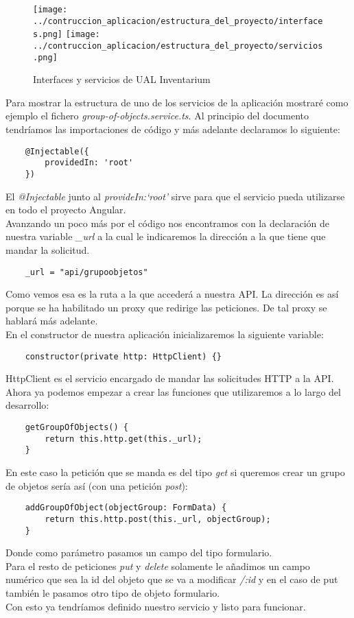 \begin{figure}[h]
    \centering
    \texttt{[image: ../contruccion\_aplicacion/estructura\_del\_proyecto/interfaces.png]}
    \texttt{[image: ../contruccion\_aplicacion/estructura\_del\_proyecto/servicios.png]}
    \caption{Interfaces y servicios de UAL Inventarium}
\end{figure}

Para mostrar la estructura de uno de los servicios de la aplicación mostraré como ejemplo el fichero \textit{group-of-objects.service.ts}. Al principio del documento tendríamos las importaciones de código y más adelante declaramos lo siguiente:
\begin{verbatim}
    @Injectable({
        providedIn: 'root'
    })
\end{verbatim}
El \textit{@Injectable} junto al \textit{provideIn:`root'} sirve para que el servicio pueda utilizarse en todo el proyecto Angular.
\\Avanzando un poco más por el código nos encontramos con la declaración de nuestra variable \textit{\_url} a la cual le indicaremos la dirección a la que tiene que mandar la solicitud.
\begin{verbatim}
    _url = "api/grupoobjetos"
\end{verbatim}
Como vemos esa es la ruta a la que accederá a nuestra API. La dirección es así porque se ha habilitado un proxy que redirige las peticiones. De tal proxy se hablará más adelante.
\\En el constructor de nuestra aplicación inicializaremos la siguiente variable:
\begin{verbatim}
    constructor(private http: HttpClient) {}
\end{verbatim}
HttpClient es el servicio encargado de mandar las solicitudes HTTP a la API.
\\Ahora ya podemos empezar a crear las funciones que utilizaremos a lo largo del desarrollo:
\begin{verbatim}
    getGroupOfObjects() {
        return this.http.get(this._url);
    }
\end{verbatim}
En este caso la petición que se manda es del tipo \textit{get} si queremos crear un grupo de objetos sería así (con una petición \textit{post}):
\begin{verbatim}
    addGroupOfObject(objectGroup: FormData) {
        return this.http.post(this._url, objectGroup);
    }
\end{verbatim}
Donde como parámetro pasamos un campo del tipo formulario.
\\Para el resto de peticiones \textit{put} y \textit{delete} solamente le añadimos un campo numérico que sea la id del objeto que se va a modificar \textit{/:id} y en el caso de put también le pasamos otro tipo de objeto formulario.
\\Con esto ya tendríamos definido nuestro servicio y listo para funcionar.

